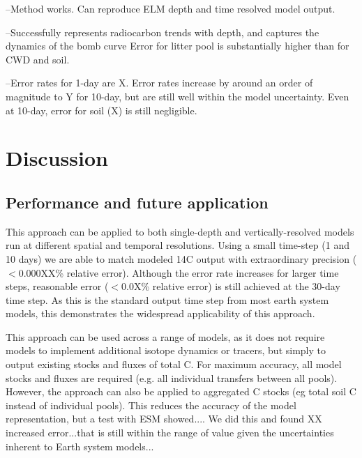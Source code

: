 \documentclass[11pt,a4paper]{article}
\begin{document}

--Method works. Can reproduce ELM depth and time resolved model output. 


--Successfully represents radiocarbon trends with depth, and captures the dynamics of the bomb curve
Error for litter pool is substantially higher than for CWD and soil.


--Error rates for 1-day are X. Error rates increase by around an order of magnitude to Y for 10-day, but are still well within the model uncertainty. Even at 10-day, error for soil (X) is still negligible.


\section{Discussion}

\subsection{Performance and future application }
This approach can be applied to both single-depth and vertically-resolved models run at different spatial and temporal resolutions. Using a small time-step (1 and 10 days) we are able to match modeled 14C output with extraordinary precision ($<$0.000XX\% relative error). Although the error rate increases for larger time steps, reasonable error ($<$0.0X\% relative error) is still achieved at the 30-day time step. As this is the standard output time step from most earth system models, this demonstrates the widespread applicability of this approach. 

This approach can be used across a range of models, as it does not require models to implement additional isotope dynamics or tracers, but simply to output existing stocks and fluxes of total C. For maximum accuracy, all model stocks and fluxes are required (e.g. all individual transfers between all pools). However, the approach can also be applied to aggregated C stocks (eg total soil C instead of individual pools). This reduces the accuracy of the model representation, but a test with ESM showed.... We did this and found XX increased error...that is still within the range of value given the uncertainties inherent to Earth system models...
\end{document}

